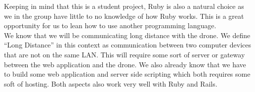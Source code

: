 
Keeping in mind that this is a student project, Ruby is also a natural choice as we in the group have little to no knowledge of how Ruby works.
This is a great opportunity for us to lean how to use another programming language. \\

We know that we will be communicating long distance with the drone.
We define ``Long Distance'' in this context as communication between two computer devices that are not on the same LAN. 
This will require some sort of server or gateway between the web application and the drone.
We also already know that we have to build some web application and server side scripting which both requires some soft of hosting.
Both aspects also work very well with Ruby and Rails. 




